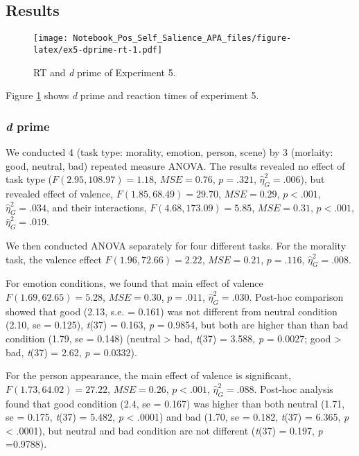 \documentclass[man]{apa6}
\begin{document}
\hypertarget{results-8}{%
\subsection{Results}\label{results-8}}

\begin{figure}
\centering
\texttt{[image: Notebook\_Pos\_Self\_Salience\_APA\_files/figure-latex/ex5-dprime-rt-1.pdf]}
\caption{\label{fig:ex5-dprime-rt}RT and \emph{d} prime of Experiment 5.}
\end{figure}

Figure \ref{fig:ex5-dprime-rt} shows \emph{d} prime and reaction times of experiment 5.

\hypertarget{d-prime-5}{%
\subsubsection{\texorpdfstring{\emph{d} prime}{d prime}}\label{d-prime-5}}

We conducted 4 (task type: morality, emotion, person, scene) by 3 (morlaity: good, neutral, bad) repeated measure ANOVA. The results revealed no effect of task type (\(F(2.95, 108.97) = 1.18\), \(\mathit{MSE} = 0.76\), \(p = .321\), \(\hat{\eta}^2_G = .006\)), but revealed effect of valence, \(F(1.85, 68.49) = 29.70\), \(\mathit{MSE} = 0.29\), \(p < .001\), \(\hat{\eta}^2_G = .034\), and their interactions, \(F(4.68, 173.09) = 5.85\), \(\mathit{MSE} = 0.31\), \(p < .001\), \(\hat{\eta}^2_G = .019\).

We then conducted ANOVA separately for four different tasks. For the morality task, the valence effect \(F(1.96, 72.66) = 2.22\), \(\mathit{MSE} = 0.21\), \(p = .116\), \(\hat{\eta}^2_G = .008\).

For emotion conditions, we found that main effect of valence \(F(1.69, 62.65) = 5.28\), \(\mathit{MSE} = 0.30\), \(p = .011\), \(\hat{\eta}^2_G = .030\). Post-hoc comparison showed that good (2.13, s.e. = 0.161) was not different from neutral condition (2.10, se = 0.125), \emph{t}(37) = 0.163, \emph{p} = 0.9854, but both are higher than than bad condition (1.79, se = 0.148) (neutral \textgreater{} bad, \emph{t}(37) = 3.588, \emph{p} = 0.0027; good \textgreater{} bad, \emph{t}(37) = 2.62, \emph{p} = 0.0332).

For the person appearance, the main effect of valence is significant, \(F(1.73, 64.02) = 27.22\), \(\mathit{MSE} = 0.26\), \(p < .001\), \(\hat{\eta}^2_G = .088\). Post-hoc analysis found that good condition (2.4, se = 0.167) was higher than both neutral (1.71, se = 0.175, \emph{t}(37) = 5.482, \emph{p} \textless{} .0001) and bad (1.70, se = 0.182, \emph{t}(37) = 6.365, \emph{p} \textless{} .0001), but neutral and bad condition are not different (\emph{t}(37) = 0.197, \emph{p} =0.9788).
\end{document}
